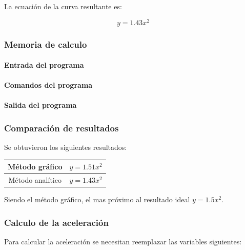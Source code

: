 \documentclass[letter,11pt]{article}
\begin{document}
La ecuación de la curva resultante es:

\begin{equation}
    y = 1.43 x^2
\end{equation}

\subsubsection{Memoria de calculo}

\paragraph{Entrada del programa}
\begin{alltt}
\footnotesize

\normalsize
\end{alltt}

\paragraph{Comandos del programa}
\begin{alltt}
\footnotesize

\normalsize
\end{alltt}

\paragraph{Salida del programa}
\begin{alltt}
\footnotesize

\normalsize
\end{alltt}

\subsubsection{Comparación de resultados}
Se obtuvieron los siguientes resultados:

\begin{center}
\begin{tabular}{|c|c|}
\hline
Método gráfico & $y = 1.51 x^2$ \\
\hline
Método analítico & $y = 1.43 x^2$ \\
\hline
\end{tabular}
\end{center}

Siendo el método gráfico, el mas próximo al resultado ideal $y = 1.5 x^2$.

\subsubsection{Calculo de la aceleración}
Para calcular la aceleración se necesitan reemplazar las variables siguientes:
\end{document}
